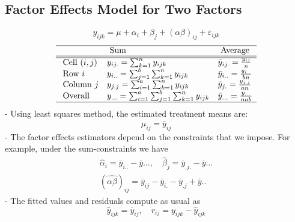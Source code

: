 \documentclass[11pt,a4paper]{article}
\begin{document}
\subsection{Factor Eﬀects Model for Two Factors}
$$y_{ijk}=\mu+\alpha_i+\beta_j+(\alpha\beta)_{ij}+\varepsilon_{ijk}$$
\begin{equation}
    \begin{array}{lll}
    \hline & \text { Sum } & \text { Average } \\
    \hline \hline \text { Cell }(i, j) & y_{i j .}=\sum_{k=1}^{n} y_{i j k} & \bar{y}_{i j .}=\frac{y_{i j}}{n} \\
    \text { Row } i & y_{i . .}=\sum_{j=1}^{b} \sum_{k=1}^{n} y_{i j k} & \bar{y}_{i . .}=\frac{y_{i . .}}{b n} \\
    \text { Column } j & y_{j . j}=\sum_{i=1}^{a} \sum_{k=1}^{n} y_{i j k} & \bar{y}_{j .}=\frac{y_{j . j}}{a n} \\
    \text { Overall } & y_{...}=\sum_{i=1}^{a} \sum_{j=1}^{b} \sum_{k=1}^{n} y_{i j k} & \bar{y}_{...}=\frac{y_{...}}{n a b} \\
    \hline
    \end{array}
    \nonumber
\end{equation}
- Using least squares method, the estimated treatment means are:
$$
\hat{\mu}_{i j}=\bar{y}_{i j}
$$
- The factor effects estimators depend on the constraints that we impose. For example, under the sum-constraints we have
$$
\begin{gathered}
\hat{\alpha}_{i}=\bar{y}_{i . .}-\bar{y} \ldots, \quad \hat{\beta}_{j}=\bar{y}_{. j .}-\bar{y} \ldots \\
(\hat{\alpha \beta})_{i j}=\bar{y}_{i j}-\bar{y}_{i .}-\bar{y}_{. j}+\bar{y} . .
\end{gathered}
$$
- The fitted values and residuals compute as usual as
$$
\hat{y}_{i j k}=\bar{y}_{i j}, \quad r_{i j}=y_{i j k}-\hat{y}_{i j k}
$$
\end{document}
